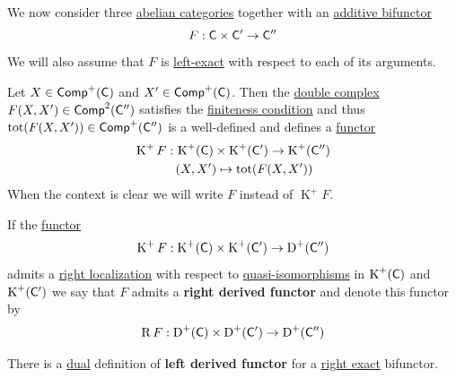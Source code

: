 \documentclass[../../main]{subfiles}
\begin{document}
We now consider three \hyperref[def:abelian-category]{abelian categories} together with an \hyperref[def:additive-functor]{additive bifunctor}
\begin{equation*}
  F: \category{C} \times \category{C'} \to \category{C''}
\end{equation*}
We will also assume that \(F\) is \hyperref[def:exact-functor]{left-exact} with respect to each of its arguments.

Let \(X \in \Complex[+]{\category{C}}\) and \(X' \in \Complex[+]{\category{C}}\).
Then the \hyperref[def:double-complex]{double complex} \(F(X, X') \in \Complex[2]{\category{C''}}\) satisfies the \hyperref[def:finiteness-condition-double-complex]{finiteness condition} and thus \(\operatorname{tot}(F(X, X')) \in \Complex[+]{\category{C''}}\) is a well-defined and defines a \hyperref[def:functor]{functor}
\begin{align*}
  \operatorname{K}^{+}F:\,& \operatorname{K}^{+}(\category{C}) \times \operatorname{K}^{+}(\category{C'}) \to \operatorname{K}^{+}(\category{C''}) \\
                          & (X, X') \mapsto \operatorname{tot}(F(X, X'))
\end{align*}
When the context is clear we will write \(F\) instead of \(\operatorname{K}^{+}F\).

\begin{definition}\label{def:right-derived-bifunctor}
  If the \hyperref[def:functor]{functor}
  \begin{equation*}
    \operatorname{K}^{+}F: \operatorname{K}^{+}(\category{C}) \times \operatorname{K}^{+}(\category{C'}) \to \operatorname{D}^{+}(\category{C''})
  \end{equation*}
  admits a \hyperref[def:localization-functor]{right localization} with respect to \hyperref[def:quasi-isomorphism]{quasi-isomorphisms} in \(\operatorname{K}^{+}(\category{C})\) and \(\operatorname{K}^{+}(\category{C'})\) we say that \(F\) admits a \textbf{right derived functor} and denote this functor by
  \begin{equation*}
    \operatorname{R}F: \operatorname{D}^{+}(\category{C}) \times \operatorname{D}^{+}(\category{C'}) \to \operatorname{D}^{+}(\category{C''})
  \end{equation*}

  There is a \hyperref[def:dual]{dual} definition of \textbf{left derived functor} for a \hyperref[def:exact-functor]{right exact} bifunctor.
\end{definition}
\end{document}

